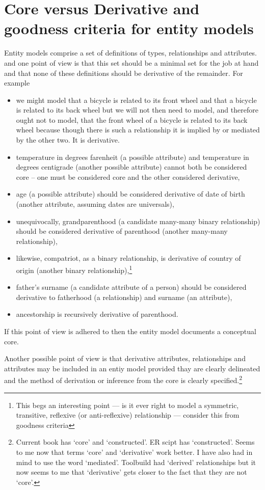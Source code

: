 
\section{Core versus Derivative \small and goodness criteria for entity models}
\label{CoreversusDerivative}
\mynote Entity models comprise a set of definitions of types, relationships and attributes. 
and one point of view is that this set should be a minimal set for the job at hand and that none of these definitions should be derivative of the remainder. For example
\begin{itemize}
\item we might model that a bicycle is related to its front wheel and that a bicycle is related to its back wheel but we will not then need to model,  and therefore ought not to model, that the front wheel of a bicycle is related to its back wheel because though there is such a relationship it is implied by or mediated by the other two. It is derivative.
\item temperature in degrees farenheit (a possible attribute) and temperature in degrees centigrade (another possible attribute) cannot both be considered core -- one must be considered core and the other considered derivative,
\item age (a possible attribute) should be considered derivative of date of birth (another attribute, assuming dates are universals),
\item unequivocally, grandparenthood (a candidate many-many binary relationship) should be considered derivative of parenthood (another many-many relationship),
\item likewise, compatriot, as a binary relationship, is derivative of country of origin (another binary relationship),\footnote{This begs an interesting point --- is it ever right to model a symmetric, transitive, reflexive (or anti-reflexive) relationship --- consider this from goodness criteria}
\item father's surname (a candidate attribute of a person)  should be considered derivative to fatherhood (a relationship) and surname (an attribute), 
\item ancestorship is recursively derivative of parenthood. 
\end{itemize}

If this point of view is adhered to then the entity model documents a conceptual core.

\mynote
Another possible point of view is that derivative attributes, relationships and attributes may be included in an entiy model provided thay are clearly delineated and the method of derivation or inference from the core
is clearly specified.\footnote{Current book has `core' and `constructed'. ER scipt has `constructed'. Seems to me now that terms `core' and `derivative' work better.
I have also had in mind to use the word `mediated'. Toolbuild had `derived' relationships but it now seems to me that `derivative' gets closer to the fact that they are not `core'. }

